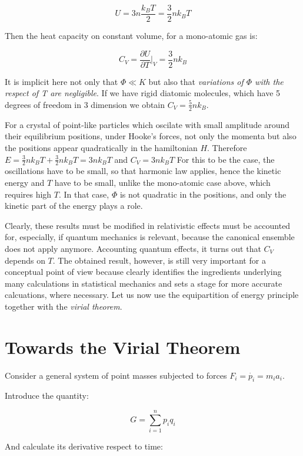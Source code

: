 \documentclass{article}
\begin{document}
$$U = 3n \frac{k_B T}{2} = \frac{3}{2}n k_B T$$

Then the heat capacity on constant volume, for a mono-atomic gas is:

$$C_V = \frac{\partial U}{\partial T} \big |_V = \frac{3}{2}n k_B$$

It is implicit here not only that $\Phi \ll K$ but also that \emph{variations of $\Phi$ with the respect of T are negligible}. If we have rigid diatomic molecules, which have 5 degrees of freedom in 3 dimension we obtain $C_V = \frac{5}{2} n k_B$. \newline

For a crystal of point-like particles which oscilate with small amplitude around their equilibrium positions, under Hooke's forces, not only the momenta but also the positions appear quadratically in the hamiltonian $H$. Therefore $E=\frac{3}{2}n k_B T + \frac{3}{2}n k_B T = 3nk_BT$ and $C_V = 3nk_BT$
For this to be the case, the oscillations have to be small, so that harmonic law applies, hence the kinetic energy and $T$ have to be small, unlike the mono-atomic case above, which requires high $T$. In that case, $\Phi$ is not quadratic in the positions, and only the kinetic part of the energy plays a role.

Clearly, these results must be modified in relativistic effects must be accounted for, especially, if quantum mechanics is relevant, because the canonical ensemble does not apply anymore. Accounting quantum effects, it turns out that $C_V$ depends on $T$.
\newline
The obtained result, however, is still very important for a conceptual point of view because clearly identifies the ingredients underlying many calculations in statistical mechanics and sets a stage for more accurate calcuations, where necessary. Let us now use the equipartition of energy principle together with the \textit{virial theorem}. 
\newpage
\section{ Towards the Virial Theorem}

Consider a general system of point masses subjected to forces $F_i = \dot{p_i} = m_i a_i$.

Introduce the quantity:

\begin{equation}
G = \sum_{i=1}^{n} p_i q_i
\end{equation}

And calculate its derivative respect to time:
\end{document}
